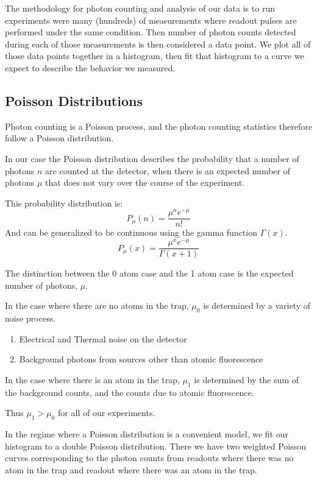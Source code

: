 \documentclass{article}
\begin{document}
The methodology for photon counting and analysis of our data is to run experiments were many (hundreds) of measurements where readout pulses are performed under the same condition. Then number of photon counts detected during each of those measurements is then considered a data point. We plot all of those data points together in a histogram, then fit that histogram to a curve we expect to describe the behavior we measured.

\subsection{Poisson Distributions}

Photon counting is a Poisson process, and the photon counting statistics therefore follow a Poisson distribution.

In our case the Poisson distribution describes the probability that a number of photons $n$ are counted at the detector, when there is an expected number of photons $\mu$ that does not vary over the course of the experiment.

This probability distribution is:
\[P_{\mu}(n) = \frac{\mu^n e^{-\mu}}{n!}\]
And can be generalized to be continuous using the gamma function $\Gamma(x)$.
\[P_{\mu}(x) = \frac{\mu^x e^{-\mu}}{\Gamma(x+1)}\]

The distinction between the 0 atom case and the 1 atom  case is the expected number of photons, $\mu$.

In the case where there are no atoms in the trap, $\mu_0$ is determined by a variety of noise process.
\begin{enumerate}
    \item Electrical and Thermal noise on the detector
    \item Background photons from sources other than atomic fluorescence 
\end{enumerate}

In the case where there is an atom in the trap, $\mu_1$ is determined by the sum of the background counts, and the counts due to atomic fluorescence.

Thus $\mu_1 > \mu_0$ for all of our experiments.

In the regime where a Poisson distribution is a convenient model, we fit our histogram to a double Poisson distribution. There we have two weighted Poisson curves corresponding to the photon counts from readouts where there was no atom in the trap and readout where there was an atom in the trap.
\end{document}
